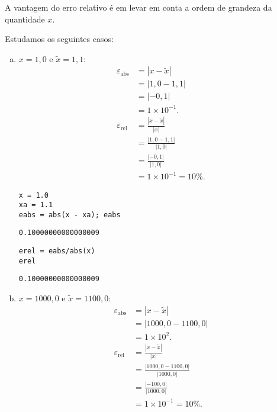 A vantagem do erro relativo é em levar em conta a ordem de grandeza da quantidade $x$.

\begin{ex}\label{ex:medidas_de_erros}
  Estudamos os seguintes casos:
  \begin{enumerate}[a)]
  \item $x=1,0$ e $\tilde{x} = 1,1$:
    \begin{align}
      \varepsilon_{\text{abs}} &= |x - \tilde{x}| \\
                        &= |1,0 - 1,1|\\
                        &= |-0,1|\\
                        &= 1\times 10^{-1}.\\
      \varepsilon_{\text{rel}} &= \frac{|x - \tilde{x}|}{|x|} \\
                        &= \frac{|1,0-1,1|}{|1,0|}\\
                        &= \frac{|-0,1|}{|1,0|}\\
                        &= 1\times 10^{-1} = 10\%.
    \end{align}
    
\begin{lstlisting}
x = 1.0
xa = 1.1
eabs = abs(x - xa); eabs
\end{lstlisting}

\begin{verbatim}
0.10000000000000009
\end{verbatim}

\begin{lstlisting}
erel = eabs/abs(x)
erel
\end{lstlisting}

\begin{verbatim}
0.10000000000000009
\end{verbatim}

    
  \item $x=1000,0$ e $\tilde{x} = 1100,0$:
    \begin{align}
      \varepsilon_{\text{abs}} &= |x - \tilde{x}| \\
                        &= |1000,0 - 1100,0|\\
                        &= 1\times 10^2.\\
      \varepsilon_{\text{rel}} &= \frac{|x - \tilde{x}|}{|x|} \\
                        &= \frac{|1000,0 - 1100,0|}{|1000,0|}\\
                        &= \frac{|-100,0|}{|1000,0|}\\
                        &= 1\times 10^{-1} = 10\%.
    \end{align}
    

\end{enumerate}
\end{ex}
